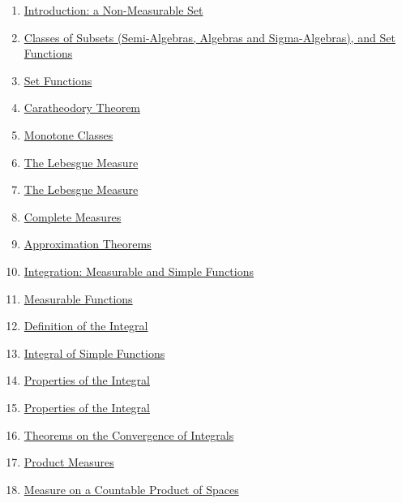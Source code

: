 \documentclass[11pt]{article}
\begin{document}
\begin{enumerate}
	\item  \href{https://mp.weixin.qq.com/s/b9FJpiIY7BKfce9Z9HU-ow}{Introduction: a Non-Measurable Set} %
	\item  \href{https://mp.weixin.qq.com/s/dBiLjqKzZb2gk9YSTrk_Dw}{Classes of Subsets (Semi-Algebras, Algebras and Sigma-Algebras), and Set Functions} %
	\item  \href{https://mp.weixin.qq.com/s/jzHMKWAp3jSrCexCl-Us_Q}{Set Functions} %
	\item  \href{https://mp.weixin.qq.com/s/RS7Ibmr7uWWy3oEVoh3nVw}{Caratheodory Theorem} %
	\item  \href{https://mp.weixin.qq.com/s/K8D9t_bzb8SNSAIG9lQWiQ}{Monotone Classes} %
	\item  \href{https://mp.weixin.qq.com/s/mHZMWyYLc5MNkIHFTrzR3Q}{The Lebesgue Measure } %
	\item  \href{https://mp.weixin.qq.com/s/VKhF1i_X06lQPkTT39D_Vg}{The Lebesgue Measure } %
	\item  \href{https://mp.weixin.qq.com/s/bnXj4J-Bkyax5fOP2JGKVw}{Complete Measures} %
	\item  \href{https://mp.weixin.qq.com/s/K4Zq7DJBefFx_IkINnqAGw}{Approximation Theorems} %
	\item  \href{https://mp.weixin.qq.com/s/YRzGd7GIeCyuA0IozMmdqQ}{Integration: Measurable and Simple Functions} %
	\item  \href{https://mp.weixin.qq.com/s/WLhUgmxFZqtpVhAZ3fUFeQ}{Measurable Functions} %
	\item  \href{https://mp.weixin.qq.com/s/tFUgk0xWCUuaE4-hIt0srg}{Definition of the Integral} %
	\item  \href{https://mp.weixin.qq.com/s/Xud27rm6RUcgyPeBRLbgRw}{Integral of Simple Functions} %
	\item  \href{https://mp.weixin.qq.com/s/Ouq0ZkfN4ADsNA__Gy7gWA}{Properties of the Integral } %
	\item  \href{https://mp.weixin.qq.com/s/bOemxfw7TNU6GF1Dc_cYtA}{Properties of the Integral } %
	\item  \href{https://mp.weixin.qq.com/s/Cad_2DwS3CEcOT0geOsAHw}{Theorems on the Convergence of Integrals} %
	\item  \href{https://mp.weixin.qq.com/s/gE3MlL3AVhegVQ0gzwKKfQ}{Product Measures} %
	\item  \href{https://mp.weixin.qq.com/s/qI7Lu8k72VnyeIWJhwFDVg}{Measure on a Countable Product of Spaces} %

\end{enumerate}
\end{document}
